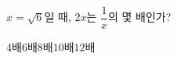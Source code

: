 $x=\sqrt{6}$일 때, $2x$는 $\dfrac{1}{x}$의 몇 배인가?
\begin{choices32}{$4$배}{$6$배}{$8$배}{$10$배}{$12$배}\end{choices32}
